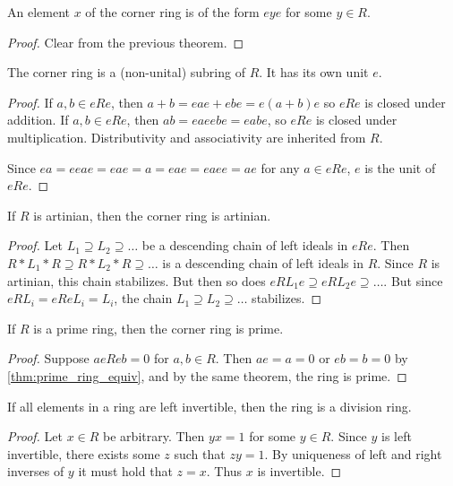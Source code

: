   \begin{theorem}
    \label{thm:characterization_of_corner_ring_elements'}
    An element $x$ of the corner ring is of the form $e y e$ for some $y \in R$.
  \end{theorem}
  \begin{proof}
    Clear from the previous theorem.
  \end{proof}

  \begin{theorem}
    \label{thm:corner_ring_is_ring}
    The corner ring is a (non-unital) subring of $R$. It has its own unit $e$.
  \end{theorem}
  \begin{proof}
    If $a, b \in eRe$, then $a + b = e a e + e b e = e (a + b) e$ so $eRe$ is closed under addition.
    If $a, b \in eRe$, then $a b = e a e e b e  = e a b e$, so $eRe$ is closed under multiplication.
    Distributivity and associativity are inherited from $R$.

    Since $e a = eeae = eae = a = eae = eaee = ae$ for any $a \in eRe$, $e$ is the unit of $eRe$.
  \end{proof}

  \begin{theorem}
    \label{thm:corner_ring_artinian}
    If $R$ is artinian, then the corner ring is artinian.
  \end{theorem}
  \begin{proof}
    Let $L_1 \supseteq L_2 \supseteq \ldots$ be a descending chain of left ideals in $eRe$. Then $ R * L_1 * R \supseteq R * L_2 * R \supseteq \ldots$ is a descending chain of left ideals in $R$. Since $R$ is artinian, this chain stabilizes. But then so does $e R L_1 e \supseteq e R L_2 e \supseteq \ldots$. But since $eRL_i = e R e L_i = L_i$, the chain $L_1 \supseteq L_2 \supseteq \ldots$ stabilizes.
  \end{proof}

  \begin{theorem}
    \label{thm:corner_ring_prime}
    If $R$ is a prime ring, then the corner ring is prime.
  \end{theorem}
  \begin{proof}
    Suppose $a e R e b = 0$ for $a, b \in R$. Then $ae = a = 0$ or $eb = b = 0$ by \ref{thm:prime_ring_equiv}, and by the same theorem, the ring is prime.
  \end{proof}

  \begin{theorem}
    \label{thm:all_left_inv_div_ring}
    If all elements in a ring are left invertible, then the ring is a division ring.
  \end{theorem}
  \begin{proof}
    Let $x \in R$ be arbitrary. Then $yx = 1$ for some $y \in R$. Since $y$ is left invertible, there exists some $z$ such that $zy = 1$. By uniqueness of left and right inverses of $y$ it must hold that $z = x$. Thus $x$ is invertible.
  \end{proof}

